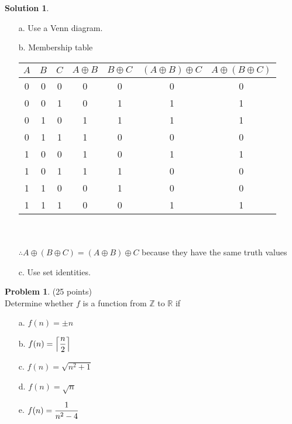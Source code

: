 \documentclass{article}
\theoremstyle{definition}
\newtheorem{problem}{Problem}
\newtheorem*{solution}{Solution}
\begin{document}
\begin{solution}\ \\
  \begin{enumerate}
  \item[a.] Use a Venn diagram.

  \item[b.] Membership table
    \begin{center}
      \begin{tabular}{|c|c|c||c|c|c|c|}
        \hline
        $A$ & $B$ & $C$ & $A \oplus B$ & $B \oplus C$ & $(A \oplus B) \oplus C$ & $A \oplus (B \oplus C)$ \\ [0.5ex]
        \hline
        0 & 0 & 0 & 0 & 0 & 0 & 0 \\
        \hline
        0 & 0 & 1 & 0 & 1 & 1 & 1 \\
        \hline
        0 & 1 & 0 & 1 & 1 & 1 & 1 \\
        \hline
        0 & 1 & 1 & 1 & 0 & 0 & 0 \\
        \hline
        1 & 0 & 0 & 1 & 0 & 1 & 1 \\
        \hline
        1 & 0 & 1 & 1 & 1 & 0 & 0 \\
        \hline
        1 & 1 & 0 & 0 & 1 & 0 & 0 \\
        \hline
        1 & 1 & 1 & 0 & 0 & 1 & 1 \\
        \hline
      \end{tabular} \\ \ \\
      $\therefore A \oplus (B \oplus C) = (A \oplus B) \oplus C$ because they have the same truth values
    \end{center}

  \item[c.] Use set identities.

  \end{enumerate}
\end{solution}

\newpage

\begin{problem} (25 points)\\
Determine whether $f$ is a function from $\mathbb{Z}$ to $\mathbb{R}$ if
\begin{enumerate}
\item[a.] $f(n) = \pm n$
\item[b.] $\displaystyle f(n) = \left\lceil{n \over 2}\right\rceil$
\item[c.] $f(n) = \sqrt{n^2+1}$
\item[d.] $f(n) = \sqrt{n}$
\item[e.] $\displaystyle f(n) = {1 \over n^2 - 4}$
\end{enumerate}
\end{problem}
\end{document}
